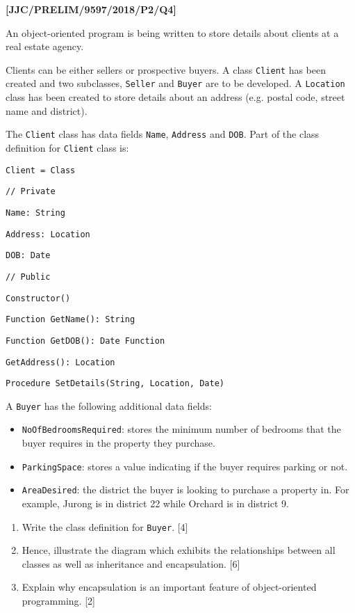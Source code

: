 \item \textbf{{[}JJC/PRELIM/9597/2018/P2/Q4{]} }

An object-oriented program is being written to store details about
clients at a real estate agency. 

Clients can be either sellers or prospective buyers. A class \texttt{Client}
has been created and two subclasses, \texttt{Seller} and \texttt{Buyer}
are to be developed. A \texttt{Location} class has been created to
store details about an address (e.g. postal code, street name and
district). 

The \texttt{Client} class has data fields \texttt{Name}, \texttt{Address}
and \texttt{DOB}. Part of the class definition for \texttt{Client}
class is: 

\noindent\begin{minipage}[t]{1\columnwidth}%
\texttt{Client = Class}

\texttt{\qquad{}// Private }

\texttt{\qquad{}Name: String}

\texttt{\qquad{}Address: Location }

\texttt{\qquad{}DOB: Date}

\bigskip{}

\texttt{\qquad{}// Public }

\texttt{\qquad{}Constructor() }

\texttt{\qquad{}Function GetName(): String }

\texttt{\qquad{}Function GetDOB(): Date Function}

\texttt{\qquad{}GetAddress(): Location }

\texttt{\qquad{}Procedure SetDetails(String, Location, Date) }%
\end{minipage}

A \texttt{Buyer} has the following additional data fields: 
\begin{itemize}
\item \texttt{NoOfBedroomsRequired}: stores the minimum number of bedrooms
that the buyer requires in the property they purchase.
\item \texttt{ParkingSpace}: stores a value indicating if the buyer requires
parking or not. 
\item \texttt{AreaDesired}: the district the buyer is looking to purchase
a property in. For example, Jurong is in district 22 while Orchard
is in district 9. 
\end{itemize}
\begin{enumerate}
\item Write the class definition for \texttt{Buyer}. \hfill{}{[}4{]}
\item Hence, illustrate the diagram which exhibits the relationships between
all classes as well as inheritance and encapsulation. \hfill{}{[}6{]}
\item Explain why encapsulation is an important feature of object-oriented
programming. \hfill{}{[}2{]}
\end{enumerate}